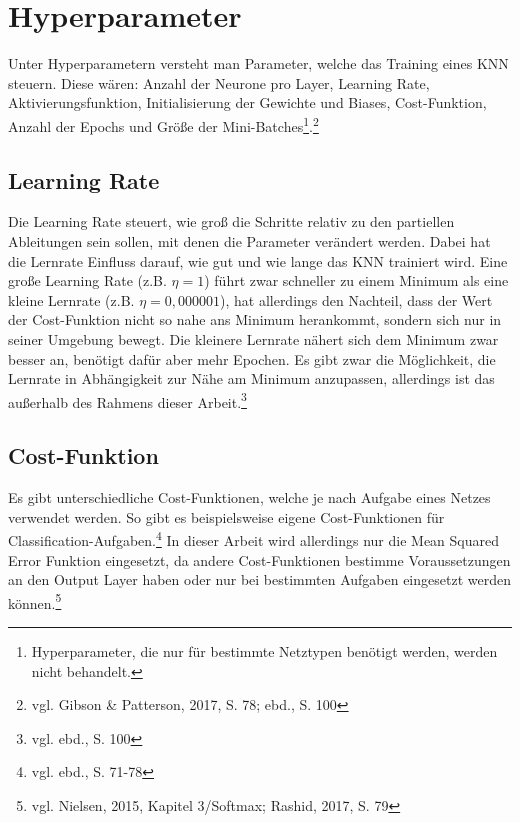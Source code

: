 \documentclass[
	a4paper,
	12pt,
	ngerman,
	oneside
]{scrreprt}											%
\newcommand{\ebd}[1]{vgl. ebd., S. {#1}}
\begin{document}
	
		\section{Hyperparameter} \label{Hyperparameter}
			Unter Hyperparametern versteht man Parameter, welche das Training eines KNN steuern. Diese wären: Anzahl der Neurone pro Layer, Learning Rate, Aktivierungsfunktion, Initialisierung der Gewichte und Biases, Cost-Funktion, Anzahl der Epochs und Größe der Mini-Batches\footnote{Hyperparameter, die nur für bestimmte Netztypen benötigt werden, werden nicht behandelt.}.\footnote{vgl. Gibson \& Patterson, 2017, S. 78; ebd., S. 100}

			\subsection{Learning Rate}
				Die Learning Rate steuert, wie groß die Schritte relativ zu den partiellen Ableitungen sein sollen, mit denen die Parameter verändert werden. Dabei hat die Lernrate Einfluss darauf, wie gut und wie lange das KNN trainiert wird. Eine große Learning Rate (z.B. $\eta = 1$) führt zwar schneller zu einem Minimum als eine kleine Lernrate (z.B. $\eta = 0,000001$), hat allerdings den Nachteil, dass der Wert der Cost-Funktion nicht so nahe ans Minimum herankommt, sondern sich nur in seiner Umgebung bewegt. Die kleinere Lernrate nähert sich dem Minimum zwar besser an, benötigt \newpage 
				dafür aber mehr Epochen. Es gibt zwar die Möglichkeit, die Lernrate in Abhängigkeit zur Nähe am Minimum anzupassen, allerdings ist das außerhalb des Rahmens dieser Arbeit.\footnote{\ebd{100}}

			\subsection{Cost-Funktion}\label{Optimierung:Cost-Funktion}
				Es gibt unterschiedliche Cost-Funktionen, welche je nach Aufgabe eines Netzes verwendet werden. So gibt es beispielsweise eigene Cost-Funktionen für Classification-Aufgaben.\footnote{\ebd{71-78}} In dieser Arbeit wird allerdings nur die Mean Squared Error Funktion eingesetzt, da andere Cost-Funktionen bestimme Voraussetzungen an den Output Layer haben oder nur bei bestimmten Aufgaben eingesetzt werden können.\footnote{vgl. Nielsen, 2015, Kapitel 3/Softmax; Rashid, 2017, S. 79}
	
\end{document}
